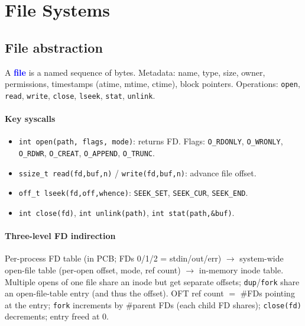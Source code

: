 \section{File Systems}

\subsection{File abstraction}
A \textcolor{Blue}{\textbf{file}} is a named sequence of bytes. \textcolor{Bittersweet}{Metadata}: name, type, size, owner, permissions, timestamps (atime, mtime, ctime), block pointers.
Operations: \texttt{open}, \texttt{read}, \texttt{write}, \texttt{close}, \texttt{lseek}, \texttt{stat}, \texttt{unlink}.

\paragraph{Key syscalls}
\begin{itemize}
  \item \texttt{int \textcolor{Bittersweet}{open}(path, flags, mode)}: returns FD. Flags: \texttt{O\_RDONLY}, \texttt{O\_WRONLY}, \texttt{O\_RDWR}, \texttt{O\_CREAT}, \texttt{O\_APPEND}, \texttt{O\_TRUNC}.
  \item \texttt{ssize\_t \textcolor{Bittersweet}{read}(fd,buf,n)} / \texttt{\textcolor{Bittersweet}{write}(fd,buf,n)}: advance file offset.
  \item \texttt{off\_t \textcolor{Bittersweet}{lseek}(fd,off,whence)}: \texttt{SEEK\_SET}, \texttt{SEEK\_CUR}, \texttt{SEEK\_END}.
  \item \texttt{int \textcolor{Bittersweet}{close}(fd)}, \texttt{int \textcolor{Bittersweet}{unlink}(path)}, \texttt{int \textcolor{Bittersweet}{stat}(path,\&buf)}.
\end{itemize}

\paragraph{Three-level FD indirection}
\textcolor{Bittersweet}{Per-process FD table} (in PCB; FDs 0/1/2 = stdin/out/err) $\to$ \textcolor{Bittersweet}{system-wide open-file table} (per-open offset, mode, ref count) $\to$ \textcolor{Bittersweet}{in-memory inode table}. Multiple opens of one file share an inode but get separate offsets; \texttt{dup}/\texttt{fork} share an open-file-table entry (and thus the offset).
\textcolor{Bittersweet}{OFT ref count} $=$ \#FDs pointing at the entry; \texttt{fork} increments by \#parent FDs (each child FD shares); \texttt{close(fd)} decrements; entry freed at 0.

